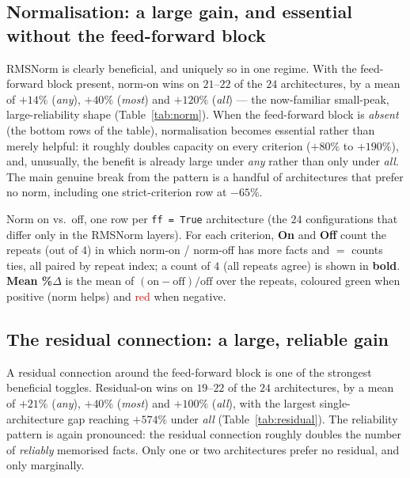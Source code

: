 \documentclass[11pt,a4paper]{article}
\begin{document}
\subsection{Normalisation: a large gain, and essential without the feed-forward block}
\label{sec:e5-norms}

RMSNorm is clearly beneficial, and uniquely so in one regime. With the feed-forward block present, norm-on wins on $21$--$22$ of the $24$ architectures, by a mean of $+14\%$ (\emph{any}), $+40\%$ (\emph{most}) and $+120\%$ (\emph{all}) --- the now-familiar small-peak, large-reliability shape (Table~\ref{tab:norm}). When the feed-forward block is \emph{absent} (the bottom rows of the table), normalisation becomes essential rather than merely helpful: it roughly doubles capacity on every criterion ($+80\%$ to $+190\%$), and, unusually, the benefit is already large under \emph{any} rather than only under \emph{all}. The main genuine break from the pattern is a handful of architectures that prefer no norm, including one strict-criterion row at $-65\%$.

\begin{table}[ht]
\footnotesize
\setlength{\tabcolsep}{4pt}
\begin{adjustwidth}{-1.5cm}{-1.5cm}
\centering

\end{adjustwidth}
\caption{Norm on vs.\ off, one row per \texttt{ff = True} architecture (the $24$ configurations that differ only in the RMSNorm layers). For each criterion, \textbf{On} and \textbf{Off} count the repeats (out of $4$) in which norm-on / norm-off has more facts and \textbf{$=$} counts ties, all paired by repeat index; a count of $4$ (all repeats agree) is shown in \textbf{bold}. \textbf{Mean \%$\Delta$} is the mean of $(\text{on}-\text{off})/\text{off}$ over the repeats, coloured \textcolor{green!55!black}{green} when positive (norm helps) and \textcolor{red}{red} when negative.}
\label{tab:norm}
\end{table}

\subsection{The residual connection: a large, reliable gain}

A residual connection around the feed-forward block is one of the strongest beneficial toggles. Residual-on wins on $19$--$22$ of the $24$ architectures, by a mean of $+21\%$ (\emph{any}), $+40\%$ (\emph{most}) and $+100\%$ (\emph{all}), with the largest single-architecture gap reaching $+574\%$ under \emph{all} (Table~\ref{tab:residual}). The reliability pattern is again pronounced: the residual connection roughly doubles the number of \emph{reliably} memorised facts. Only one or two architectures prefer no residual, and only marginally.
\end{document}
